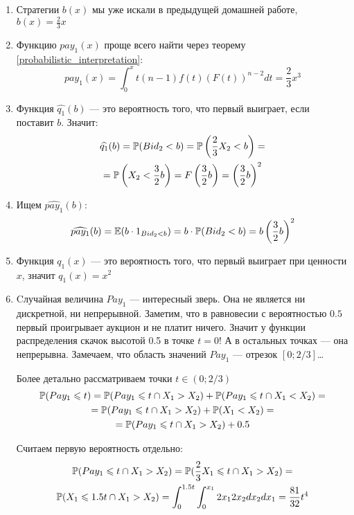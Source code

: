 \begin{enumerate}
\begin{enumerate}
\item Стратегии $ b(x) $ мы уже искали в предыдущей домашней работе, $ b(x)=\frac{2}{3}x $
\item Функцию $ pay_{1}(x) $ проще всего найти через теорему \ref{probabilistic_interpretation}:
\begin{equation}
pay_{1}(x)=\int_{0}^{x}t(n-1)f(t)(F(t))^{n-2}dt=\frac{2}{3}x^{3}
\end{equation}
\item Функция $ \widehat{q_{1}}(b) $ — это вероятность того, что первый выиграет, если поставит $ b $. Значит:
\begin{multline}
\widehat{q_{1}}(b)=\P(Bid_{2}<b)=\P\left(\frac{2}{3}X_{2}<b\right)=\\
=\P\left( X_{2}<\frac{3}{2}b\right)=F\left(\frac{3}{2}b\right)=\left(\frac{3}{2}b\right)^{2}
\end{multline}
\item Ищем $ \widehat{pay_{1}}(b) $:
\begin{equation}
\widehat{pay_{1}}(b)=\E(b\cdot 1_{Bid_{2}<b})=b\cdot \P(Bid_{2}<b)=b\left(\frac{3}{2}b\right)^{2}
\end{equation}
\item Функция $ q_{1}(x) $ — это вероятность того, что первый выиграет при ценности $ x $, значит $ q_{1}(x)=x^{2} $
\item Cлучайная величина $ Pay_{1} $ — интересный зверь. Она не является ни дискретной, ни непрерывной. Заметим, что в равновесии с вероятностью $ 0.5 $ первый проигрывает аукцион и не платит ничего. Значит у функции распределения скачок высотой 0.5 в точке $ t=0 $! А в остальных точках — она непрерывна. Замечаем, что область значений $ Pay_{1} $ — отрезок $ [0;2/3] $\ldots

Более детально рассматриваем точки $ t\in (0;2/3) $
\begin{multline}
\P(Pay_{1}\leq t)=\P(Pay_{1}\leq t \cap X_{1}>X_{2})+\P(Pay_{1}\leq t \cap X_{1}<X_{2})=\\
=\P(Pay_{1}\leq t \cap X_{1}>X_{2})+\P(X_{1}<X_{2})=\\
=\P(Pay_{1}\leq t \cap X_{1}>X_{2})+0.5
\end{multline}

Считаем первую вероятность отдельно:
\begin{multline}
\P(Pay_{1}\leq t \cap X_{1}>X_{2})=\P(\frac{2}{3}X_{1}\leq t \cap X_{1}>X_{2})=\\
\P(X_{1}\leq 1.5t \cap X_{1}>X_{2})=\int_{0}^{1.5t}\int_{0}^{x_{1}} 2x_{1}2x_{2}dx_{2}dx_{1}=\frac{81}{32}t^{4}
\end{multline}


\end{enumerate}
\end{enumerate}
